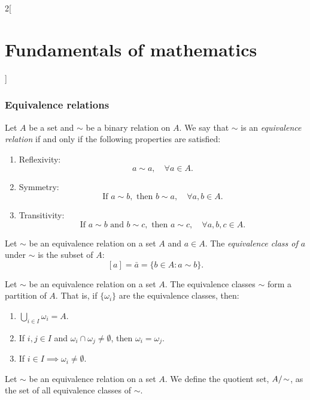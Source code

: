 \documentclass[../../../main.tex]{subfiles}
\begin{document}
\begin{multicols}{2}[\section{Fundamentals of mathematics}]
\subsubsection*{Equivalence relations}
\begin{definition}
    Let $A$ be a set and $\sim$ be a binary relation on $A$. We say that $\sim$ is an \textit{equivalence relation} if and only if the following properties are satisfied:
    \begin{enumerate}
        \item Reflexivity: $$a\sim a,\quad\forall a\in A.$$
        \item Symmetry: $$\text{If }a\sim b, \text{ then }b\sim a,\quad\forall a,b\in A.$$
        \item Transitivity:
        $$\text{If }a\sim b\text{ and }b\sim c,\text{ then }a\sim c,\quad\forall a,b,c\in A.$$
    \end{enumerate}
\end{definition}
\begin{definition}
    Let $\sim$ be an equivalence relation on a set $A$ and $a\in A$. The \textit{equivalence class of $a$} under $\sim$ is the subset of $A$: $$[a]=\bar{a}=\{b\in A: a\sim b\}.$$
\end{definition}
\begin{theorem}
    Let $\sim$ be an equivalence relation on a set $A$. The equivalence classes $\sim$ form a partition of $A$. That is, if $\{\omega_i\}$ are the equivalence classes, then:
    \begin{enumerate}
        \item $\bigcup_{i\in I} \omega_i=A$.
        \item If $i,j\in I$ and $\omega_i\cap\omega_j\ne\emptyset$, then $\omega_i=\omega_j$.
        \item If $i\in I\implies\omega_i\ne\emptyset$.
    \end{enumerate}
\end{theorem}
\begin{definition}
    Let $\sim$ be an equivalence relation on a set $A$. We define the quotient set, $\quot{A}{\!\sim}$, as the set of all equivalence classes of $\sim$.
\end{definition}

\end{multicols}
\end{document}
